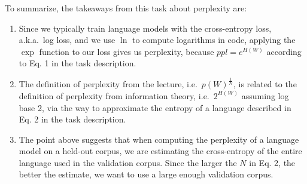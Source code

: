 \documentclass[11pt,a4paper]{article}
\begin{document}
To summarize, the takeaways from this task about perplexity are:
\begin{enumerate}
    \item Since we typically train language models with the cross-entropy loss,
          a.k.a.\ log loss, and we use $\ln$ to compute logarithms in code,
          applying the $\exp$ function to our loss gives us perplexity, because
          $ppl = e^{H(W)}$ according to Eq. 1 in the task description.
    \item The definition of perplexity from the lecture, i.e.\
          $p(W)^{\frac{1}{N}}$, is related to the definition of perplexity from
          information theory, i.e.\ $2^{H(W)}$ assuming log base 2, via the way
          to approximate the entropy of a language described in Eq. 2 in the 
          task description.
    \item The point above suggests that when computing the perplexity of a
          language model on a held-out corpus, we are estimating the 
          cross-entropy of the entire language used in the validation corpus.
          Since the larger the $N$ in Eq. 2, the better the estimate, we want 
          to use a large enough validation corpus.
\end{enumerate}
\end{document}
